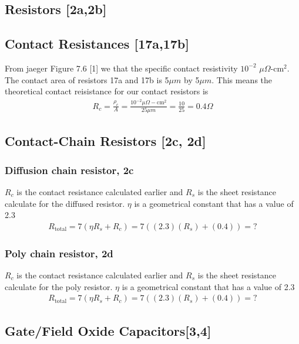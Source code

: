 \documentclass{article}
\begin{document}
\subsection{Resistors [2a,2b]}


\subsection{Contact Resistances [17a,17b]}
From jaeger Figure 7.6 [1] we that the specific contact resistivity $10^{-2}$ $\mu \Omega$-$\text{cm}^2$. The contact area of resistors 17a and 17b is 5$\mu m$ by 5$\mu m$. This means the theoretical contact reisistance for our contact resistors is
\begin{align*}
R_c = \frac{\rho_c}{A} = \frac{10^{-2} \mu \Omega-\text{cm}^2}{25 \mu m} = \frac{10}{25} = 0.4 \Omega
\end{align*}


\subsection{Contact-Chain Resistors [2c, 2d]}
\subsubsection{Diffusion chain resistor, 2c}
$R_c$ is the contact resistance calculated earlier and $R_s$ is the sheet resistance calculate for the diffused resistor. $\eta$ is a geometrical constant that has a value of 2.3
\begin{align*}
R_{\text{total}} = 7(\eta R_s + R_c) = 7((2.3)(R_s) + (0.4)) = ?
\end{align*}
\subsubsection{Poly chain resistor, 2d}
$R_c$ is the contact resistance calculated earlier and $R_s$ is the sheet resistance calculate for the poly resistor. $\eta$ is a geometrical constant that has a value of 2.3
\begin{align*}
R_{\text{total}} = 7(\eta R_s + R_c) = 7((2.3)(R_s) + (0.4)) = ?
\end{align*}


\subsection{Gate/Field Oxide Capacitors[3,4]}
\end{document}
